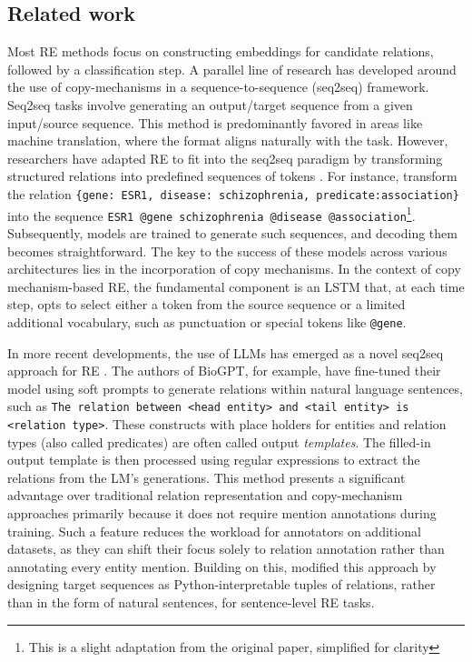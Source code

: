 \documentclass[11pt]{article}
\begin{document}
\subsection{Related work}
Most RE methods focus on constructing embeddings for candidate relations, followed by a classification step. A parallel line of research has developed around the use of copy-mechanisms in a sequence-to-sequence (seq2seq) framework. Seq2seq tasks involve generating an output/target sequence from a given input/source sequence. This method is predominantly favored in areas like machine translation, where the format aligns naturally with the task. However, researchers have adapted RE to fit into the seq2seq paradigm by transforming structured relations into predefined sequences of tokens \cite{zeng-etal-2018-extracting, zhang-etal-2020-minimize, Nayak_Ng_2020, Zeng_Zhang_Liu_2020, giorgi-etal-2022-sequence}. For instance, \citet{giorgi-etal-2022-sequence} transform the relation \texttt{\{gene: ESR1, disease: schizophrenia, predicate:association\}} into the sequence \texttt{ESR1 @gene schizophrenia @disease @association}\footnote{This is a slight adaptation from the original paper, simplified for clarity}. Subsequently, models are trained to generate such sequences, and decoding them becomes straightforward. The key to the success of these models across various architectures lies in the incorporation of copy mechanisms. In the context of copy mechanism-based RE, the fundamental component is an LSTM that, at each time step, opts to select either a token from the source sequence or a limited additional vocabulary, such as punctuation or special tokens like \texttt{@gene}.

In more recent developments, the use of LLMs has emerged as a novel seq2seq approach for RE \cite{luo2022biogpt, gupta2025comparison}. The authors of BioGPT, for example, have fine-tuned their model using soft prompts to generate relations within natural language sentences, such as \texttt{The relation between <head entity> and <tail entity> is <relation type>}. These constructs with place holders for entities and relation types (also called predicates) are often called output \textit{templates}. The filled-in output template is then processed using regular expressions to extract the relations from the LM's generations. This method presents a significant advantage over traditional relation representation and copy-mechanism approaches primarily because it does not require mention annotations during training. Such a feature reduces the workload for annotators on additional datasets, as they can shift their focus solely to relation annotation rather than annotating every entity mention. Building on this, \citet{wadhwa-etal-2023-revisiting} modified this approach by designing target sequences as Python-interpretable tuples of relations, rather than in the form of natural sentences, for sentence-level RE tasks.
\end{document}
